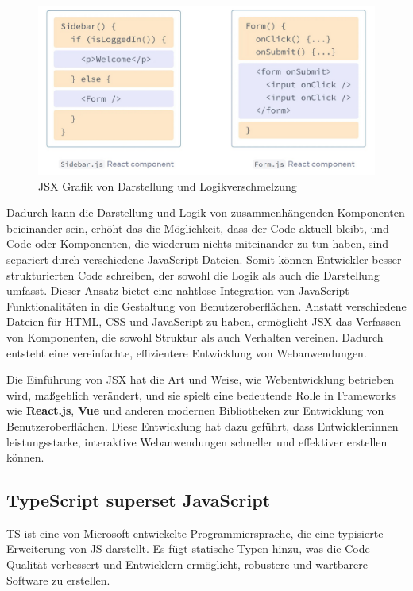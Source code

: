 \begin{figure}[h]
    \centering
    \includegraphics[width=1\textwidth]{images/02/ReactJS-JSX-Component.jpeg}
    \caption{JSX Grafik von Darstellung und Logikverschmelzung\cite{react-jsx-form-component, react-jsx-sidebar-component}}
\end{figure}

Dadurch kann die Darstellung und Logik von zusammenhängenden Komponenten beieinander sein, erhöht das die Möglichkeit, dass der Code aktuell bleibt, und Code oder Komponenten, die wiederum nichts miteinander zu tun haben, sind separiert durch verschiedene JavaScript-Dateien. Somit können Entwickler besser strukturierten Code schreiben, der sowohl die Logik als auch die Darstellung umfasst. Dieser Ansatz bietet eine nahtlose Integration von JavaScript-Funktionalitäten in die Gestaltung von Benutzeroberflächen. Anstatt verschiedene Dateien für \acs{HTML}, \acs{CSS} und JavaScript zu haben, ermöglicht \acs{JSX} das Verfassen von Komponenten, die sowohl Struktur als auch Verhalten vereinen. Dadurch entsteht eine vereinfachte, effizientere Entwicklung von Webanwendungen.

Die Einführung von \acs{JSX} hat die Art und Weise, wie Webentwicklung betrieben wird, maßgeblich verändert, und sie spielt eine bedeutende Rolle in Frameworks wie \textbf{React.js}, \textbf{Vue} und anderen modernen Bibliotheken zur Entwicklung von Benutzeroberflächen. Diese Entwicklung hat dazu geführt, dass Entwickler:innen leistungsstarke, interaktive Webanwendungen schneller und effektiver erstellen können.\cite{react-jsx-explained}

\subsection{TypeScript superset JavaScript}

\acf{TS} ist eine von Microsoft entwickelte Programmiersprache, die eine typisierte Erweiterung von \acl{JS} darstellt. Es fügt statische Typen hinzu, was die Code-Qualität verbessert und Entwicklern ermöglicht, robustere und wartbarere Software zu erstellen. \cite{typescript}

